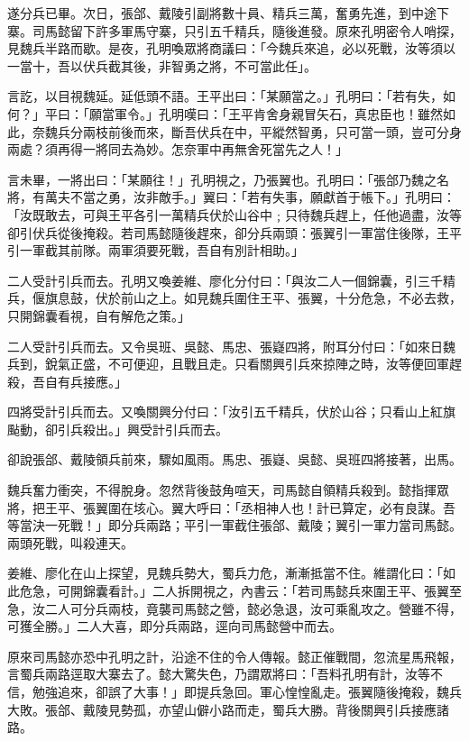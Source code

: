 遂分兵已畢。次日，張郃、戴陵引副將數十員、精兵三萬，奮勇先進，到中途下寨。司馬懿留下許多軍馬守寨，只引五千精兵，隨後進發。原來孔明密令人哨探，見魏兵半路而歇。是夜，孔明喚眾將商議曰：「今魏兵來追，必以死戰，汝等須以一當十，吾以伏兵截其後，非智勇之將，不可當此任」。

言訖，以目視魏延。延低頭不語。王平出曰：「某願當之。」孔明曰：「若有失，如何？」平曰：「願當軍令。」孔明嘆曰：「王平肯舍身親冒矢石，真忠臣也！雖然如此，奈魏兵分兩枝前後而來，斷吾伏兵在中，平縱然智勇，只可當一頭，豈可分身兩處？須再得一將同去為妙。怎奈軍中再無舍死當先之人！」

言未畢，一將出曰：「某願往！」孔明視之，乃張翼也。孔明曰：「張郃乃魏之名將，有萬夫不當之勇，汝非敵手。」翼曰：「若有失事，願獻首于帳下。」孔明曰：「汝既敢去，可與王平各引一萬精兵伏於山谷中﹔只待魏兵趕上，任他過盡，汝等卻引伏兵從後掩殺。若司馬懿隨後趕來，卻分兵兩頭：張翼引一軍當住後隊，王平引一軍截其前隊。兩軍須要死戰，吾自有別計相助。」

二人受計引兵而去。孔明又喚姜維、廖化分付曰：「與汝二人一個錦囊，引三千精兵，偃旗息鼓，伏於前山之上。如見魏兵圍住王平、張翼，十分危急，不必去救，只開錦囊看視，自有解危之策。」

二人受計引兵而去。又令吳班、吳懿、馬忠、張嶷四將，附耳分付曰：「如來日魏兵到，銳氣正盛，不可便迎，且戰且走。只看關興引兵來掠陣之時，汝等便回軍趕殺，吾自有兵接應。」

四將受計引兵而去。又喚關興分付曰：「汝引五千精兵，伏於山谷；只看山上紅旗颭動，卻引兵殺出。」興受計引兵而去。

卻說張郃、戴陵領兵前來，驟如風雨。馬忠、張嶷、吳懿、吳班四將接著，出馬。

魏兵奮力衝突，不得脫身。忽然背後鼓角喧天，司馬懿自領精兵殺到。懿指揮眾將，把王平、張翼圍在垓心。翼大呼曰：「丞相神人也！計已算定，必有良謀。吾等當決一死戰！」即分兵兩路；平引一軍截住張郃、戴陵；翼引一軍力當司馬懿。兩頭死戰，叫殺連天。

姜維、廖化在山上探望，見魏兵勢大，蜀兵力危，漸漸抵當不住。維謂化曰：「如此危急，可開錦囊看計。」二人拆開視之，內書云：「若司馬懿兵來圍王平、張翼至急，汝二人可分兵兩枝，竟襲司馬懿之營，懿必急退，汝可乘亂攻之。營雖不得，可獲全勝。」二人大喜，即分兵兩路，逕向司馬懿營中而去。

原來司馬懿亦恐中孔明之計，沿途不住的令人傳報。懿正催戰間，忽流星馬飛報，言蜀兵兩路逕取大寨去了。懿大驚失色，乃謂眾將曰：「吾料孔明有計，汝等不信，勉強追來，卻誤了大事！」即提兵急回。軍心惶惶亂走。張翼隨後掩殺，魏兵大敗。張郃、戴陵見勢孤，亦望山僻小路而走，蜀兵大勝。背後關興引兵接應諸路。

